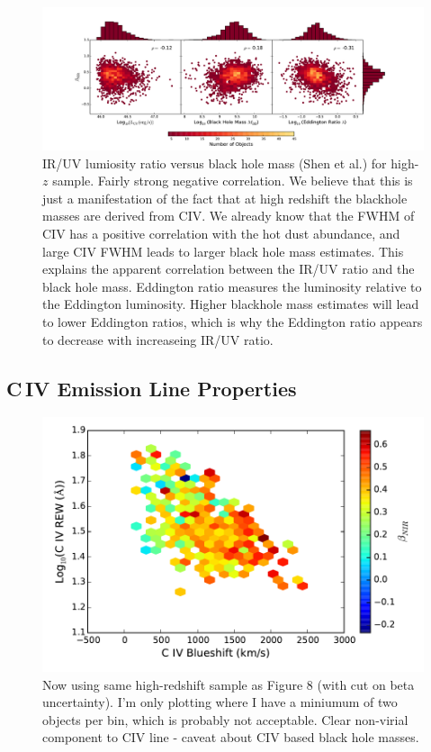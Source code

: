 \begin{figure}
  \begin{minipage}{180mm}
  \includegraphics[width=\columnwidth]{figures/chapter06/correlations_highz}
   \caption{IR/UV lumiosity ratio versus black hole mass (Shen et al.) for high-$z$ sample. Fairly strong negative correlation. We believe that this is just a manifestation of the fact that at high redshift the blackhole masses are derived from CIV. We already know that the FWHM of CIV has a positive correlation with the hot dust abundance, and large CIV FWHM leads to larger black hole mass estimates. This explains the apparent correlation between the IR/UV ratio and the black hole mass. Eddington ratio measures the luminosity relative to the Eddington luminosity. Higher blackhole mass estimates will lead to lower Eddington ratios, which is why the Eddington ratio appears to decrease with increaseing IR/UV ratio.}
  \end{minipage}
\end{figure}

\subsection{C\,IV Emission Line Properties}



\begin{figure}
\centering
  \includegraphics[width=\columnwidth]{figures/chapter06/civ_2d}
\caption{Now using same high-redshift sample as Figure 8 (with cut on beta uncertainty). I'm only plotting where I have a miniumum of two objects per bin, which is probably not acceptable. Clear non-virial component to CIV line - caveat about CIV based black hole masses. }
  \label{fig:fig}
\end{figure}



